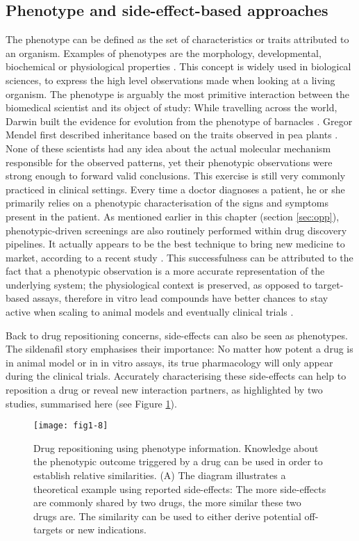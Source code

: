 \subsection{Phenotype and side-effect-based approaches}

The phenotype can be defined as the set of characteristics or traits attributed to an organism. Examples of phenotypes are the morphology, developmental, biochemical or physiological properties \citep{phenotypewiki}. This concept is widely used in biological sciences, to express the high level observations made when looking at a living organism. The phenotype is arguably the most primitive interaction between the biomedical scientist and its object of study: While travelling across the world, Darwin built the evidence for evolution from the phenotype of barnacles \citep{darwin2009origin}. Gregor Mendel first described inheritance based on the traits observed in pea plants \citep{mendel1866versuche}. None of these scientists had any idea about the actual molecular mechanism responsible for the observed patterns, yet their phenotypic observations were strong enough to forward valid conclusions. This exercise is still very commonly practiced in clinical settings. Every time a doctor diagnoses a patient, he or she primarily relies on a phenotypic characterisation of the signs and symptoms present in the patient. As mentioned earlier in this chapter (section \ref{sec:opp}), phenotypic-driven screenings are also routinely performed within drug discovery pipelines. It actually appears to be the best technique to bring new medicine to market, according to a recent study \citep{swinney2011were}. This successfulness can be attributed to the fact that a phenotypic observation is a more accurate representation of the underlying system; the physiological context is preserved, as opposed to target-based assays, therefore in vitro lead compounds have better chances to stay active when scaling to animal models and eventually clinical trials \citep{duran2012recycling}.

Back to drug repositioning concerns, side-effects can also be seen as phenotypes. The sildenafil story emphasises their importance: No matter how potent a drug is in animal model or in in vitro assays, its true pharmacology will only appear during the clinical trials. Accurately characterising these side-effects can help to reposition a drug or reveal new interaction partners, as highlighted by two studies, summarised here (see Figure \ref{fig1-8}).

\begin{figure}[ht]
    \centering
    \texttt{[image: fig1-8]}
    \caption{Drug repositioning using phenotype information. Knowledge about the phenotypic outcome triggered by a drug can be used in order to establish relative similarities. (A) The diagram illustrates a theoretical example using reported side-effects: The more side-effects are commonly shared by two drugs, the more similar these two drugs are. The similarity can be used to either derive potential off-targets or new indications.}
    \label{fig1-8}
\end{figure}

